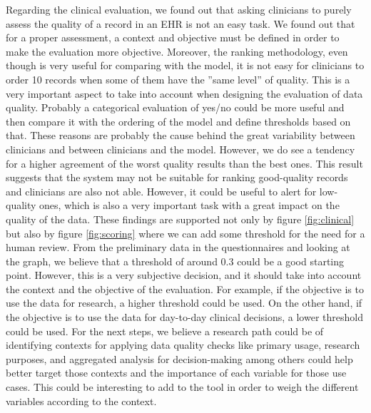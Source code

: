 Regarding the clinical evaluation, we found out that asking clinicians to purely assess the quality of a record in an EHR is not an easy task. We found out that for a proper assessment, a context and objective must be defined in order to make the evaluation more objective. Moreover, the ranking methodology, even though is very useful for comparing with the model, it is not easy for clinicians to order 10 records when some of them have the ”same level” of quality. This is a very important aspect to take into account when designing the evaluation of data quality. Probably a categorical evaluation of yes/no could be more useful and then compare it with the ordering of the model and define thresholds based on that. These reasons are probably the cause behind the great variability between clinicians and between clinicians and the model. However, we do see a tendency for a higher agreement of the worst quality results than the best ones. This result suggests that the system may not be suitable for ranking good-quality records and clinicians are also not able. However, it could be useful to alert for low-quality ones, which is also a very important task with a great impact on the quality of the data. These findings are supported not only by figure \ref{fig:clinical} but also by figure \ref{fig:scoring} where we can add some threshold for the need for a human review. From the preliminary data in the questionnaires and looking at the graph, we believe that a threshold of around 0.3 could be a good starting point. However, this is a very subjective decision, and it should take into account the context and the objective of the evaluation. For example, if the objective is to use the data for research, a higher threshold could be used. On the other hand, if the objective is to use the data for day-to-day clinical decisions, a lower threshold could be used.
For the next steps, we believe a research path could be of identifying contexts for applying data quality checks like primary usage, research purposes, and aggregated analysis for decision-making among others could help better target those contexts and the importance of each variable for those use cases. This could be interesting to add to the tool in order to weigh the different variables according to the context.


